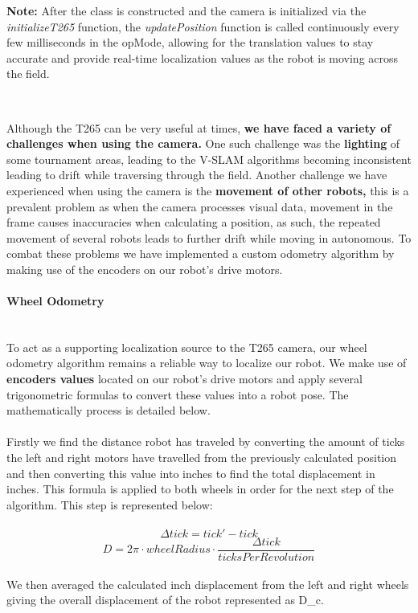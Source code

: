 \documentclass[a4paper,12pt]{article}
\begin{document}
\begin{tcolorbox}
\textbf{Note:} After the class is constructed and the camera is initialized via the \textit{initializeT265} function, the \textit{updatePosition} function is called continuously every few milliseconds in the opMode, allowing for the translation values to stay accurate and provide real-time localization values as the robot is moving across the field. 
\end{tcolorbox}
\pagebreak
\inputminted[linenos, numbersep=5pt, tabsize=4, frame=lines, label=T265 Implementation, escapeinside=||,mathescape=true]{java}{{CodeFiles/T265_Code.java}}

\\
\noindent Although the T265 can be very useful at times, \textbf{we have faced a variety of challenges when using the camera.} One such challenge was the \textbf{lighting} of some tournament areas, leading to the V-SLAM algorithms becoming inconsistent leading to drift while traversing through the field. Another challenge we have experienced when using the camera is the \textbf{movement of other robots,} this is a prevalent problem as when the camera processes visual data, movement in the frame causes inaccuracies when calculating a position, as such, the repeated movement of several robots leads to further drift while moving in autonomous. To combat these problems we have implemented a custom odometry algorithm by making use of the encoders on our robot's drive motors. 
\\
\thispagestyle{empty}
\hspace{-0.65cm}\paragraph{Wheel Odometry}\mbox{} \\
To act as a supporting localization source to the T265 camera, our wheel odometry algorithm remains a reliable way to localize our robot. We make use of \textbf{encoders values} located on our robot's drive motors and apply several trigonometric formulas to convert these values into a robot pose. The mathematically process is detailed below.
\\ 
\\
Firstly we find the distance robot has traveled by converting the amount of ticks the left and right motors have travelled from the previously calculated position  and then converting this value into inches to find the total displacement in inches. This formula is applied to both wheels in order for the next step of the algorithm. This step is represented below:
\\
\\
\begin{equation*}
\Delta{tick} = tick' - tick
\end{equation*}
\begin{equation*}
D = 2\pi \cdot wheelRadius \cdot \frac{\Delta{tick}}{ticksPerRevolution}
\end{equation*}
\pagebreak
\\
 We then averaged the calculated inch displacement from the left and right wheels giving the overall displacement of the robot represented as D_c.
 
\end{document}

